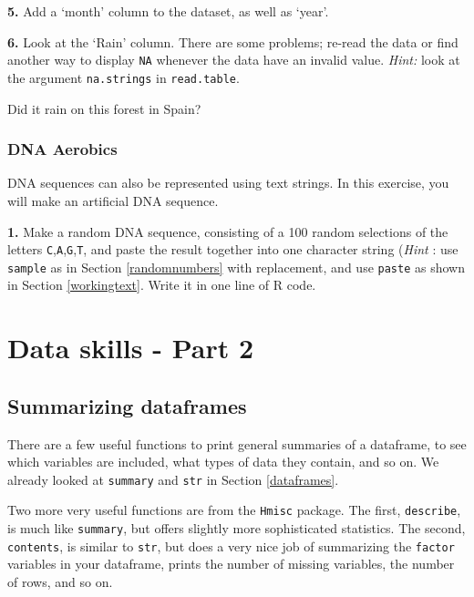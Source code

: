 \documentclass[]{book}
\begin{document}
\textbf{5.} Add a `month' column to the dataset, as well as `year'.

\textbf{6.} Look at the `Rain' column. There are some problems; re-read the data or find another way to display \texttt{NA} whenever the data have an invalid value. \emph{Hint:} look at the argument \texttt{na.strings} in \texttt{read.table}.

Did it rain on this forest in Spain?

\hypertarget{dna-aerobics}{%
\subsection{DNA Aerobics}\label{dna-aerobics}}

DNA sequences can also be represented using text strings. In this exercise, you will make an artificial DNA sequence.

\textbf{1.} Make a random DNA sequence, consisting of a 100 random selections of the letters \texttt{C},\texttt{A},\texttt{G},\texttt{T}, and paste the result together into one character string (\emph{Hint} : use \texttt{sample} as in Section \ref{randomnumbers} with replacement, and use \texttt{paste} as shown in Section \ref{workingtext}. Write it in one line of R code.

\hypertarget{dataskills2}{%
\chapter{Data skills - Part 2}\label{dataskills2}}

\hypertarget{summarizing-dataframes}{%
\section{Summarizing dataframes}\label{summarizing-dataframes}}

There are a few useful functions to print general summaries of a dataframe, to see which variables are included, what types of data they contain, and so on. We already looked at \texttt{summary} and \texttt{str} in Section \ref{dataframes}.

Two more very useful functions are from the \texttt{Hmisc} package. The first, \texttt{describe}, is much like \texttt{summary}, but offers slightly more sophisticated statistics. The second, \texttt{contents}, is similar to \texttt{str}, but does a very nice job of summarizing the \texttt{factor} variables in your dataframe, prints the number of missing variables, the number of rows, and so on.
\end{document}
